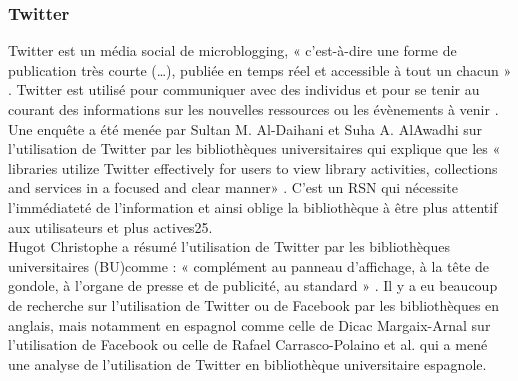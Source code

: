 \documentclass[a4paper,11pt]{article} %
\begin{document}
\subsubsection{Twitter}
Twitter est un média social de microblogging, «
c'est-à-dire une forme de publication très courte (…), publiée en temps réel et accessible à tout un chacun » \citep{mesguich2017bibliotheques,}. Twitter est utilisé pour communiquer avec des individus et pour se tenir au courant des informations sur les nouvelles ressources ou les évènements à venir \citep{cordier2013diététique,}. Une enquête a été menée par Sultan M. Al-Daihani et Suha A. AlAwadhi sur l’utilisation de Twitter par les bibliothèques universitaires qui explique que les « libraries utilize Twitter effectively for users to view library activities, collections and services in a focused and clear manner» \citep{al2015explorer,}. C’est un RSN qui nécessite l’immédiateté de l’information et ainsi oblige la bibliothèque à être plus attentif aux utilisateurs et plus actives25.
\\Hugot Christophe a résumé l’utilisation de Twitter par les bibliothèques universitaires (BU)comme : « complément au panneau d’affichage, à la tête de gondole, à l’organe de presse et de publicité, au standard » \citep{ruiz2016redes,}. Il y a eu beaucoup de recherche sur l’utilisation de Twitter ou de Facebook par les bibliothèques en anglais, mais notamment en espagnol comme celle de Dicac Margaix-Arnal sur l’utilisation de Facebook \citep{margaix2008bibliotecas,} ou celle de Rafael Carrasco-Polaino et al. qui a mené une analyse de l’utilisation de Twitter en bibliothèque universitaire espagnole. \citep{carrasco2019redes,} 
\end{document}
